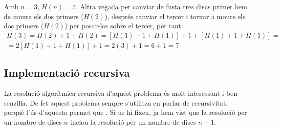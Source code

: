 Amb $n=3$, $H(n)=7$. Altra vegada per canviar de fusta tres discs primer hem de moure els dos primers ($H(2)$), després canviar el tercer i tornar a moure els dos primers ($H(2)$) per posar-los sobre el tercer, per tant:
\begin{gather*}
	H(3) = H(2)+1+H(2) = [H(1)+1+H(1)] + 1 + [H(1)+1+H(1)] = \\
	= 2[H(1)+1+H(1)] + 1 = 2(3) + 1 = 6+1 = 7
\end{gather*}

\subsection{Implementació recursiva}
La resolució algorítmica recursiva d'aquest problema és molt interessant i ben senzilla.
De fet aquest problema sempre s'utilitza en parlar de recursivitat, perquè l'ús d'aquesta permet que . 
Si us hi fixeu, ja hem vist que la resolució per un nombre de discs $n$ inclou la resolució per un nombre de discs $n-1$.

